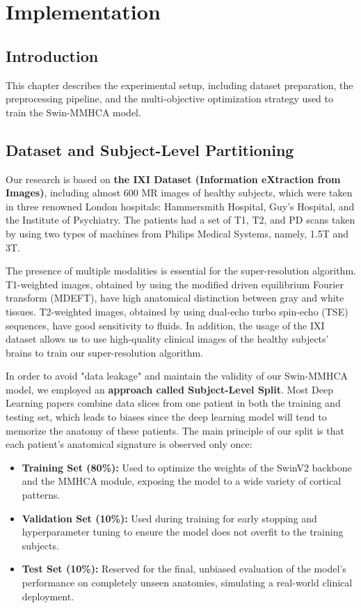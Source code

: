 \chapter{Implementation}

\section{Introduction}
This chapter describes the experimental setup, including dataset preparation, the preprocessing pipeline, and the multi-objective optimization strategy used to train the Swin-MMHCA model.

\section{Dataset and Subject-Level Partitioning}
Our research is based on \textbf{the IXI Dataset (Information eXtraction from Images)}, including almost 600 MR images of healthy subjects, which were taken in three renowned London hospitals: Hammersmith Hospital, Guy's Hospital, and the Institute of Psychiatry. The patients had a set of T1, T2, and PD scans taken by using two types of machines from Philips Medical Systems, namely, 1.5T and 3T.

The presence of multiple modalities is essential for the super-resolution algorithm. T1-weighted images, obtained by using the modified driven equilibrium Fourier transform (MDEFT), have high anatomical distinction between gray and white tissues. T2-weighted images, obtained by using dual-echo turbo spin-echo (TSE) sequences, have good sensitivity to fluids. In addition, the usage of the IXI dataset allows us to use high-quality clinical images of the healthy subjects' brains to train our super-resolution algorithm.

In order to avoid "data leakage" and maintain the validity of our Swin-MMHCA model, we employed an \textbf{approach called Subject-Level Split}. Most Deep Learning papers combine data slices from one patient in both the training and testing set, which leads to biases since the deep learning model will tend to memorize the anatomy of these patients. The main principle of our split is that each patient’s anatomical signature is observed only once:
\begin{itemize}
    \item \textbf{Training Set (80\%):} Used to optimize the weights of the SwinV2 backbone and the MMHCA module, exposing the model to a wide variety of cortical patterns.
    \item \textbf{Validation Set (10\%):} Used during training for early stopping and hyperparameter tuning to ensure the model does not overfit to the training subjects.
    \item \textbf{Test Set (10\%):} Reserved for the final, unbiased evaluation of the model's performance on completely unseen anatomies, simulating a real-world clinical deployment.
\end{itemize}

